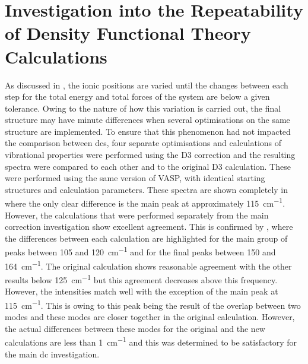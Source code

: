\section{Investigation into the Repeatability of Density Functional Theory Calculations}
\label{sec:simstud}
As discussed in , the ionic positions are varied until the changes between each step for the total energy and total forces of the system are below a given tolerance. Owing to the nature of how this variation is carried out, the final structure may have minute differences when several optimisations on the same structure are implemented. To ensure that this phenomenon had not impacted the comparison between \acrshort{dc}s, four separate optimisations and calculations of vibrational properties were performed using the D3 correction and the resulting spectra were compared to each other and to the original D3 calculation. These were performed using the same version of VASP, with identical starting structures and calculation parameters. These spectra are shown completely in  where the only clear difference is the main peak at approximately \SI{115}{cm^{-1}}. However, the calculations that were performed separately from the main correction investigation show excellent agreement. This is confirmed by , where the differences between each calculation are highlighted for the main group of peaks between 105 and \SI{120}{cm^{-1}} and for the final peaks between 150 and \SI{164}{cm^{-1}}. The original calculation shows reasonable agreement with the other results below \SI{125}{cm^{-1}} but this agreement decreases above this frequency. However, the intensities match well with the exception of the main peak at \SI{115}{cm^{-1}}. This is owing to this peak being the result of the overlap between two modes and these modes are closer together in the original calculation. However, the actual differences between these modes for the original and the new calculations are less than \SI{1}{cm^{-1}} and this was determined to be satisfactory for the main \acrshort{dc} investigation. 

